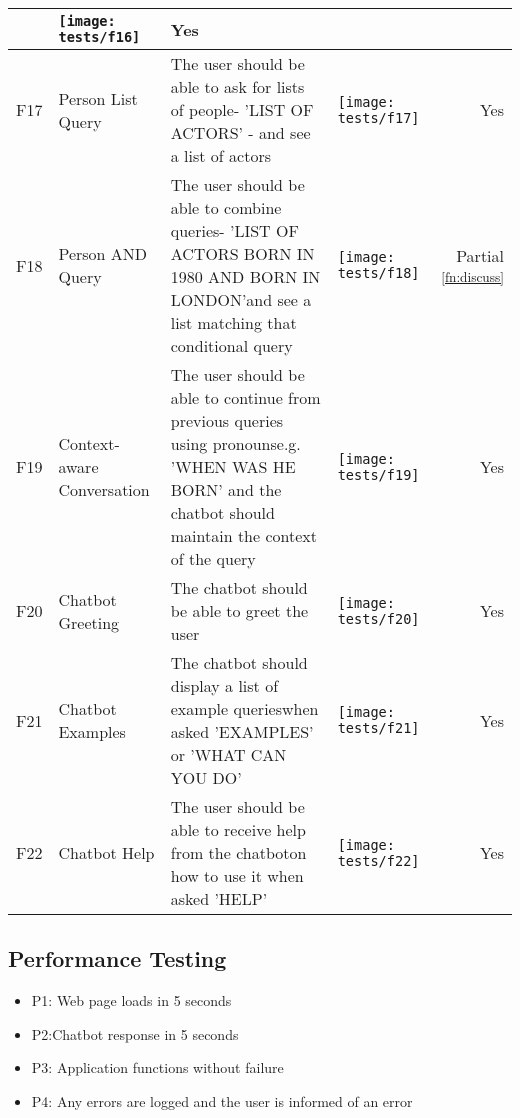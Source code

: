 \begin{landscape}
\begin{tabularx}{\hsize}{lXXXr}
		& \texttt{[image: tests/f16]} & Yes \\
		\midrule
		F17 & Person List Query
		& The user should be able to ask for lists of people\newline - 'LIST OF ACTORS' - and see a list of actors 
		& \texttt{[image: tests/f17]} & Yes \\
		\midrule
		F18 & Person AND Query
		& The user should be able to combine queries\newline - 'LIST OF ACTORS BORN IN 1980 AND BORN IN LONDON'\newline and see a list matching that conditional query
		& \texttt{[image: tests/f18]} & Partial \textsuperscript{\ref{fn:discuss}} \\
		\midrule
		F19 & Context-aware Conversation
		& The user should be able to continue from previous queries using pronouns\newline e.g. 'WHEN WAS HE BORN' and the chatbot should maintain the context of the query
		& \texttt{[image: tests/f19]} & Yes \\
		\midrule
		F20 & Chatbot Greeting
		& The chatbot should be able to greet the user
		& \texttt{[image: tests/f20]} & Yes \\
		\midrule
		F21 & Chatbot Examples
		& The chatbot should display a list of example queries\newline when asked 'EXAMPLES' or 'WHAT CAN YOU DO'
		& \texttt{[image: tests/f21]} & Yes \\
		\midrule
		F22 & Chatbot Help
		& The user should be able to receive help from the chatbot\newline on how to use it when asked 'HELP'
		& \texttt{[image: tests/f22]} & Yes \\
		\bottomrule
	\end{tabularx}
\end{landscape}

\newpage
\subsection{Performance Testing}
\begin{itemize}
	\item P1: Web page loads in 5 seconds
	\item P2:Chatbot response in 5 seconds
	\item P3: Application functions without failure
	\item P4: Any errors are logged and the user is informed of an error
\end{itemize}

